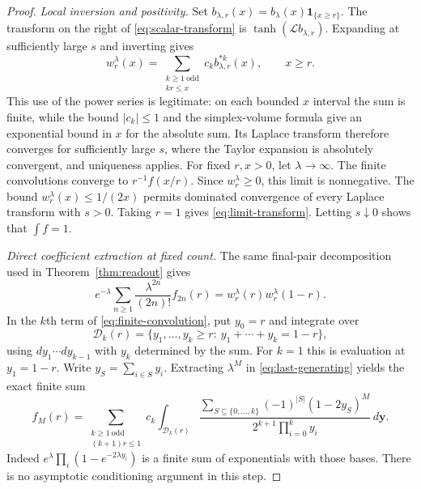 \documentclass[11pt,letterpaper]{article}
\newcommand{\ind}{\mathbf 1}\newcommand{\Exp}{\operatorname{Exp}}
\begin{document}
\begin{proof}
\emph{Local inversion and positivity.}
Set $b_{\lambda,r}(x)=b_\lambda(x)\ind_{\{x\ge r\}}$.
The transform on the right of \eqref{eq:scalar-transform} is
$\tanh(\mathcal L b_{\lambda,r})$. Expanding at sufficiently large $s$
and inverting gives
\begin{equation}\label{eq:finite-convolution}
 w_r^\lambda(x)=\sum_{\substack{k\ge1\ \mathrm{odd}\\ kr\le x}}
                 c_k b_{\lambda,r}^{*k}(x),\qquad x\ge r.
\end{equation}
This use of the power series is legitimate: on each bounded $x$ interval
the sum is finite, while the bound $|c_k|\le1$ and the simplex-volume
formula give an exponential bound in $x$ for the absolute sum. Its
Laplace transform therefore converges for sufficiently large $s$, where
the Taylor expansion is absolutely convergent, and uniqueness applies.
For fixed $r,x>0$, let $\lambda\to\infty$. The finite convolutions
converge to $r^{-1}f(x/r)$. Since $w_r^\lambda\ge0$, this limit is
nonnegative. The bound $w_r^\lambda(x)\le1/(2x)$ permits dominated
convergence of every Laplace transform with $s>0$. Taking $r=1$ gives
\eqref{eq:limit-transform}. Letting $s\downarrow0$ shows that $\int f=1$.

\emph{Direct coefficient extraction at fixed count.}
The same final-pair decomposition used in Theorem~\ref{thm:readout} gives
\begin{equation}\label{eq:last-generating}
 e^{-\lambda}\sum_{n\ge1}\frac{\lambda^{2n}}{(2n)!}f_{2n}(r)
 =w_r^\lambda(r)w_r^\lambda(1-r).
\end{equation}
In the $k$th term of \eqref{eq:finite-convolution}, put $y_0=r$ and
integrate over
\[
 \mathcal D_k(r)=\{y_1,\ldots,y_k\ge r:\ y_1+\cdots+y_k=1-r\},
\]
using $dy_1\cdots dy_{k-1}$ with $y_k$ determined by the sum.
For $k=1$ this is evaluation at $y_1=1-r$. Write
$y_S=\sum_{i\in S}y_i$. Extracting $\lambda^M$ in
\eqref{eq:last-generating} yields the exact finite sum
\begin{equation}\label{eq:last-inclusion}
 f_M(r)=\sum_{\substack{k\ge1\ \mathrm{odd}\\ (k+1)r\le1}}c_k
 \int_{\mathcal D_k(r)}
 \frac{\displaystyle\sum_{S\subseteq\{0,\ldots,k\}}
       (-1)^{|S|}(1-2y_S)^M}
      {2^{k+1}\prod_{i=0}^k y_i}\,d\mathbf y.
\end{equation}
Indeed $e^\lambda\prod_i(1-e^{-2\lambda y_i})$ is a finite
sum of exponentials with those bases. There is no asymptotic conditioning
argument in this step.


\end{proof}
\end{document}
